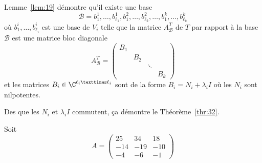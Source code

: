 \begin{remark}
  \label{rem:3}
  Lemme~\ref{lem:19} démontre qu'il existe une base 
  \begin{displaymath}
  \mathscr{B} =   b_1^1,\dots,b_{\ell_1}^1,b_1^2,\dots,b_{\ell_2}^2,\dots,b_1^k,\dots,b_{\ell_k}^k
  \end{displaymath}
  où $b_1^i,\dots,b_{\ell_i}^i$ est une base de $V_i$ telle que la matrice $A^T_\mathscr{B}$ de $T$ par rapport à la base $\mathscr{B}$ est une matrice bloc diagonale 
  \begin{displaymath}
      A^T_{\mathscr{B} }  =
      \begin{pmatrix}
        B_1 \\
        & B_2 \\
        & & \ddots \\
        & &  & B_k
      \end{pmatrix}
  \end{displaymath}
  et les matrices $B_i \in \C^{\ell_i × \ell_i}$ sont de la forme $B_i = N_i + λ_i I$ où les $N_i$ sont  nilpotentes.


  
Des que  les $N_i$ et $ λ_i I$ commutent, ça démontre le Théorème~\ref{thr:32}. 


\begin{example}
  \label{exe:47}
  Soit
  \begin{displaymath}
    A = \left(\begin{array}{rrr}
25 & 34 & 18 \\
-14 & -19 & -10 \\
-4 & -6 & -1
\end{array}\right)
\end{displaymath}


\end{example}
\end{remark}
